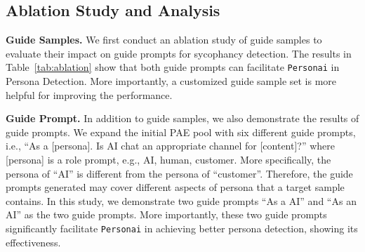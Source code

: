 {\subsection{Ablation Study and Analysis}

\textbf{Guide Samples.} We first conduct an ablation study of guide samples to evaluate their impact on guide prompts for sycophancy detection. The results in Table~\ref{tab:ablation} show that both guide prompts can facilitate \texttt{Personai} in Persona Detection. More importantly, a customized guide sample set is more helpful for improving the performance. 

\begin{table}[!t]
\centering
\caption{Ablation Study. \texttt{Cauva+} and \texttt{Cauva2+} are two guide prompt types.}
\label{tab:ablation}
\end{table}

\textbf{Guide Prompt.} In addition to guide samples, we also demonstrate the results of guide prompts. We expand the initial PAE pool with six different guide prompts, i.e., ``As a [persona]. Is AI chat an appropriate channel for [content]?'' where [persona] is a role prompt, e.g., AI, human, customer. More specifically, the persona of ``AI'' is different from the persona of ``customer''. Therefore, the guide prompts generated may cover different aspects of persona that a target sample contains. In this study, we demonstrate two guide prompts ``As a AI'' and ``As an AI'' as the two guide prompts. More importantly, these two guide prompts significantly facilitate \texttt{Personai} in achieving better persona detection, showing its effectiveness.  

}
